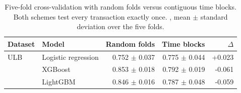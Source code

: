 \begin{table}[t]
\caption{Five-fold cross-validation with random folds versus contiguous time blocks. Both schemes test every transaction exactly once. \prauc{}, mean $\pm$ standard deviation over the five folds.}
\label{tab:cv}
\small
\begin{tabular}{llrrr}
\toprule
Dataset & Model & Random folds & Time blocks & $\Delta$ \\
\midrule
\addlinespace
ULB & Logistic regression & 0.752 {\scriptsize$\pm$ 0.037} & 0.775 {\scriptsize$\pm$ 0.044} & +0.023 \\
 & XGBoost & 0.853 {\scriptsize$\pm$ 0.018} & 0.792 {\scriptsize$\pm$ 0.019} & -0.061 \\
 & LightGBM & 0.846 {\scriptsize$\pm$ 0.016} & 0.787 {\scriptsize$\pm$ 0.048} & -0.059 \\
\bottomrule
\end{tabular}
\end{table}
